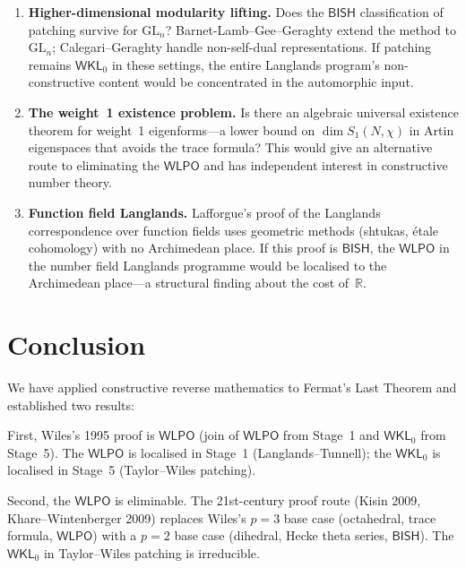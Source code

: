 \documentclass[11pt]{article}
\theoremstyle{plain}
\theoremstyle{definition}
\theoremstyle{remark}
\newcommand{\R}{\mathbb{R}}
\newcommand{\GL}{\mathrm{GL}}
\newcommand{\BISH}{\mathsf{BISH}}
\newcommand{\WLPO}{\mathsf{WLPO}}
\newcommand{\WKL}{\mathsf{WKL}_0}
\begin{document}
\begin{enumerate}[nosep]
\item \textbf{Higher-dimensional modularity lifting.}
  Does the $\BISH$ classification of patching survive for $\GL_n$?
  Barnet-Lamb--Gee--Geraghty \cite{BLGGT2014} extend the method to
  $\GL_n$; Calegari--Geraghty \cite{CalegariGeraghty2018} handle
  non-self-dual representations.  If patching remains $\WKL$ in
  these settings, the entire Langlands program's non-constructive
  content would be concentrated in the automorphic input.

\item \textbf{The weight~1 existence problem.}
  Is there an algebraic universal existence theorem for weight~1
  eigenforms---a lower bound on $\dim S_1(N, \chi)$ in Artin
  eigenspaces that avoids the trace formula?  This would give an
  alternative route to eliminating the $\WLPO$ and has independent
  interest in constructive number theory.

\item \textbf{Function field Langlands.}
  Lafforgue's proof of the Langlands correspondence over function
  fields uses geometric methods (shtukas, \'etale cohomology) with
  no Archimedean place.  If this proof is $\BISH$, the $\WLPO$ in
  the number field Langlands programme would be localised to the
  Archimedean place---a structural finding about the cost of~$\R$.
\end{enumerate}


\section{Conclusion}\label{sec:conclusion}

We have applied constructive reverse mathematics to Fermat's
Last Theorem and established two results:

First, Wiles's 1995 proof is $\WLPO$ (join of $\WLPO$ from
Stage~1 and $\WKL$ from Stage~5).  The $\WLPO$ is localised
in Stage~1 (Langlands--Tunnell); the $\WKL$ is localised in
Stage~5 (Taylor--Wiles patching).

Second, the $\WLPO$ is eliminable.  The 21st-century proof
route (Kisin 2009, Khare--Wintenberger 2009) replaces Wiles's
$p = 3$ base case (octahedral, trace formula, $\WLPO$) with a
$p = 2$ base case (dihedral, Hecke theta series, $\BISH$).
The $\WKL$ in Taylor--Wiles patching is irreducible.
\end{document}
